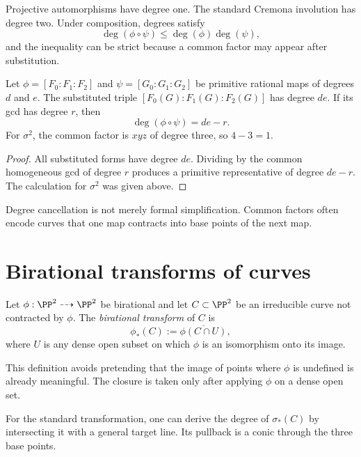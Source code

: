 Projective automorphisms have degree one.  The standard Cremona involution has degree two.  Under composition, degrees satisfy
\[
  \deg(\phi\circ\psi)\le \deg(\phi)\deg(\psi),
\]
and the inequality can be strict because a common factor may appear after substitution.

\begin{proposition}\label{prop:vi44-cancellation}
Let \(\phi=[F_0:F_1:F_2]\) and \(\psi=[G_0:G_1:G_2]\) be primitive rational maps of degrees \(d\) and \(e\).  The substituted triple \([F_0(G):F_1(G):F_2(G)]\) has degree \(de\).  If its gcd has degree \(r\), then
\[
  \deg(\phi\circ\psi)=de-r.
\]
For \(\sigma^2\), the common factor is \(xyz\) of degree three, so \(4-3=1\).
\end{proposition}

\begin{proof}
All substituted forms have degree \(de\).  Dividing by the common homogeneous gcd of degree \(r\) produces a primitive representative of degree \(de-r\).  The calculation for \(\sigma^2\) was given above.
\end{proof}

Degree cancellation is not merely formal simplification.  Common factors often encode curves that one map contracts into base points of the next map.



\section{Birational transforms of curves}

\begin{definition}\label{def:vi44-birational-transform}
Let \(\phi:\PP^2\dashrightarrow\PP^2\) be birational and let \(C\subset\PP^2\) be an irreducible curve not contracted by \(\phi\).  The \emph{birational transform} of \(C\) is
\[
  \phi_*(C):=\overline{\phi(C\cap U)},
\]
where \(U\) is any dense open subset on which \(\phi\) is an isomorphism onto its image.
\end{definition}

This definition avoids pretending that the image of points where \(\phi\) is undefined is already meaningful.  The closure is taken only after applying \(\phi\) on a dense open set.

For the standard transformation, one can derive the degree of \(\sigma_*(C)\) by intersecting it with a general target line.  Its pullback is a conic through the three base points.

